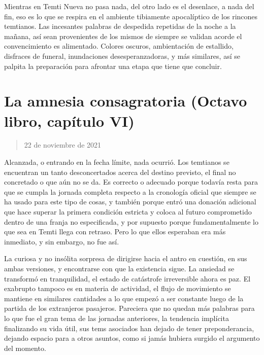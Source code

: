 \documentclass[
]{book}
\begin{document}
Mientras en Temti Nueva no pasa nada, del otro lado es el desenlace, a nada del fin, eso es lo que se respira en el ambiente tibiamente apocalíptico de los rincones temtianos. Las incesantes palabras de despedida repetidas de la noche a la mañana, así sean provenientes de los mismos de siempre se validan acorde el convencimiento es alimentado. Colores oscuros, ambientación de estallido, disfraces de funeral, inundaciones desesperanzadoras, y más similares, así se palpita la preparación para afrontar una etapa que tiene que concluir.

\hypertarget{la-amnesia-consagratoria-octavo-libro-capuxedtulo-vi}{%
\section{La amnesia consagratoria (Octavo libro, capítulo VI)}\label{la-amnesia-consagratoria-octavo-libro-capuxedtulo-vi}}

\begin{quote}
22 de noviembre de 2021
\end{quote}

Alcanzada, o entrando en la fecha límite, nada ocurrió. Los temtianos se encuentran un tanto desconcertados acerca del destino previsto, el final no concretado o que aún no se da. Es correcto o adecuado porque todavía resta para que se cumpla la jornada completa respecto a la cronología oficial que siempre se ha usado para este tipo de cosas, y también porque entró una donación adicional que hace superar la primera condición estricta y coloca al futuro comprometido dentro de una franja no especificada, y por supuesto porque fundamentalmente lo que sea en Temti llega con retraso. Pero lo que ellos esperaban era más inmediato, y sin embargo, no fue así.

La curiosa y no insólita sorpresa de dirigirse hacia el antro en cuestión, en sus ambas versiones, y encontrarse con que la existencia sigue. La ansiedad se transformó en tranquilidad, el estado de catástrofe irreversible ahora es paz. El exabrupto tampoco es en materia de actividad, el flujo de movimiento se mantiene en similares cantidades a lo que empezó a ser constante luego de la partida de los extranjeros pasajeros. Pareciera que no quedan más palabras para lo que fue el gran tema de las jornadas anteriores, la tendencia implícita finalizando su vida útil, sus tems asociados han dejado de tener preponderancia, dejando espacio para a otros asuntos, como si jamás hubiera surgido el argumento del momento.
\end{document}
